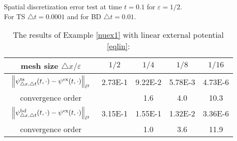 \documentclass[leqno,final]{siamltex}
\numberwithin{equation}{section}
\newcounter{me}
\begin{document}
\begin{table}[htbp]
\caption{The results of Example \ref{nuex1} with linear external
potential \eqref{eqlin}:}\label{tb1_1}
\begin{center}\footnotesize

{Spatial discretization error test at time $t=0.1$ for ${{\varepsilon }}=1/2$.\\
For TS ${\triangle} t=0.0001$ and for BD ${\triangle} t=0.01$. }
\begin{tabular}{c|cccc}\hline
mesh size ${\triangle} x/{{\varepsilon }}$& $1/2$ & $1/4$ & $1/8$ &   $1/16$ \\ \hline
$\begin{array}{c}\vspace*{-4mm} \\
\left\|\psi^{\rm ts}_{{\triangle} x,{\triangle} t}(t,\cdot)-\psi^{\rm
ex}(t,\cdot)\right\|_{l^2}\\ \vspace*{-4mm} \end{array}$
 &  2.73E-1 & 9.22E-2 &  5.78E-3 & 4.73E-6 \\ \hline
convergence order & & 1.6 & 4.0& 10.3 \\ \hline \hline
$\begin{array}{c}\vspace*{-4mm} \\
\left\|\psi^{\rm bd}_{{\triangle} x,{\triangle} t}(t,\cdot)-\psi^{\rm
ex}(t,\cdot)\right\|_{l^2}\\ \vspace*{-4mm} \end{array}$
 &  3.15E-1& 1.55E-1 &  1.32E-2 & 3.36E-6 \\ \hline
convergence order & & 1.0 & 3.6& 11.9  \\ \hline 
\end{tabular}\vspace{5mm}


\end{center}
\end{table}
\end{document}
